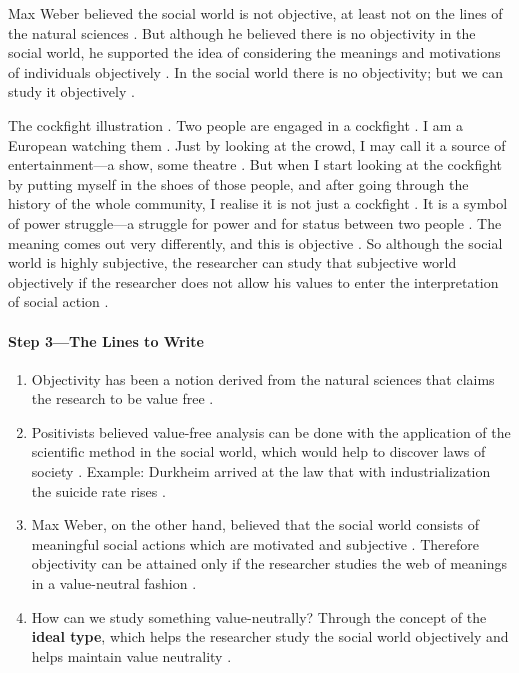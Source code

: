 Max Weber believed the social world is not objective, at least not on the lines of the natural sciences . But although he believed there is no objectivity in the social world, he supported the idea of considering the meanings and motivations of individuals objectively .
In the social world there is no objectivity; but we can study it objectively .

\begin{ExampleBox}
The cockfight illustration . Two people are engaged in a cockfight . I am a European watching them . Just by looking at the crowd, I may call it a source of entertainment---a show, some theatre .
But when I start looking at the cockfight by putting myself in the shoes of those people, and after going through the history of the whole community, I realise it is not just a cockfight . It is a symbol of power struggle---a struggle for power and for status between two people .
The meaning comes out very differently, and this is objective . So although the social world is highly subjective, the researcher can study that subjective world objectively if the researcher does not allow his values to enter the interpretation of social action .
\end{ExampleBox}

\paragraph{Step 3---The Lines to Write}
\begin{enumerate}
    \item Objectivity has been a notion derived from the natural sciences that claims the research to be value free .
    \item Positivists believed value-free analysis can be done with the application of the scientific method in the social world, which would help to discover laws of society . Example: Durkheim arrived at the law that with industrialization the suicide rate rises .
    \item Max Weber, on the other hand, believed that the social world consists of meaningful social actions which are motivated and subjective . Therefore objectivity can be attained only if the researcher studies the web of meanings in a value-neutral fashion .
    \item How can we study something value-neutrally? Through the concept of the \textbf{ideal type}, which helps the researcher study the social world objectively and helps maintain value neutrality .
\end{enumerate}

